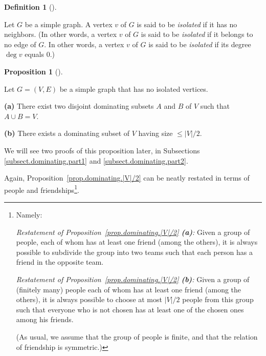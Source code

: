 \documentclass[numbers=enddot,12pt,final,onecolumn,notitlepage]{scrartcl}%
\theoremstyle{definition}
\newtheorem{prop}[theo]{Proposition}
\newenvironment{proposition}[1][]
{\begin{prop}[#1]\begin{leftbar}}
{\end{leftbar}\end{prop}}
\newtheorem{defi}[theo]{Definition}
\newenvironment{definition}[1][]
{\begin{defi}[#1]\begin{leftbar}}
{\end{leftbar}\end{defi}}
\newcommand{\abs}[1]{\left| #1 \right|}
\newcommand{\tup}[1]{\left( #1 \right)}
\begin{document}
\begin{definition} \label{def.intro.isolated}
Let $G$ be a simple graph. A vertex $v$ of $G$ is said to be
\textit{isolated} if it has no neighbors. (In other words, a vertex
$v$ of $G$ is said to be \textit{isolated} if it belongs to no edge
of $G$. In other words, a vertex
$v$ of $G$ is said to be \textit{isolated} if its degree $\deg v$
equals $0$.)
\end{definition}

\begin{proposition} \label{prop.dominating.|V|/2}
Let $G = \tup{V, E}$ be a simple graph that has no isolated vertices.

\textbf{(a)} There exist two disjoint dominating subsets $A$ and $B$
of $V$ such that $A \cup B = V$.

\textbf{(b)} There exists a dominating subset of $V$ having size
$\leq \abs{V}/2$.
\end{proposition}

We will see two proofs of this proposition later, in Subsections
\ref{subsect.dominating.part1} and \ref{subsect.dominating.part2}.

Again, Proposition~\ref{prop.dominating.|V|/2} can be neatly restated
in terms of people and friendships\footnote{Namely:

\textit{Restatement of
Proposition~\ref{prop.dominating.|V|/2} \textbf{(a)}:} Given a group
of people, each of whom has at least one friend (among the others),
it is always possible to subdivide the group into two teams such that
each person has a friend in the opposite team.

\textit{Restatement of
Proposition~\ref{prop.dominating.|V|/2} \textbf{(b)}:} Given a group
of (finitely many) people each of whom has at least one friend (among
the others),
it is always possible to choose at most $\abs{V}/{2}$ people from this
group such that everyone who is not chosen has at least one of the
chosen ones among his friends.

(As usual, we assume that the group of people is finite, and that the
relation of friendship is symmetric.)}.
\end{document}
